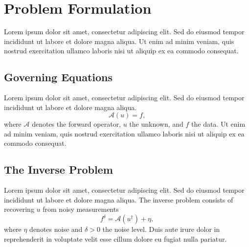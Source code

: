 \section{Problem Formulation}\label{sec:setting}


Lorem ipsum dolor sit amet, consectetur adipiscing elit. Sed do eiusmod tempor
incididunt ut labore et dolore magna aliqua. Ut enim ad minim veniam, quis
nostrud exercitation ullamco laboris nisi ut aliquip ex ea commodo consequat.

\subsection{Governing Equations}\label{ssec:governing}

Lorem ipsum dolor sit amet, consectetur adipiscing elit. Sed do eiusmod tempor
incididunt ut labore et dolore magna aliqua.
\begin{equation}\label{eq:model}
    \mathcal{A}(u) = f,
\end{equation}
where $\mathcal{A}$ denotes the forward operator, $u$ the unknown, and $f$ the
data. Ut enim ad minim veniam, quis nostrud exercitation ullamco laboris nisi ut
aliquip ex ea commodo consequat.

\subsection{The Inverse Problem}\label{ssec:inverse}

Lorem ipsum dolor sit amet, consectetur adipiscing elit. Sed do eiusmod tempor
incididunt ut labore et dolore magna aliqua. The inverse problem consists of
recovering $u$ from noisy measurements
\begin{equation}\label{eq:noise}
    f^\delta = \mathcal{A}(u^\dagger) + \eta,
\end{equation}
where $\eta$ denotes noise and $\delta>0$ the noise level. Duis aute irure dolor
in reprehenderit in voluptate velit esse cillum dolore eu fugiat nulla pariatur.

